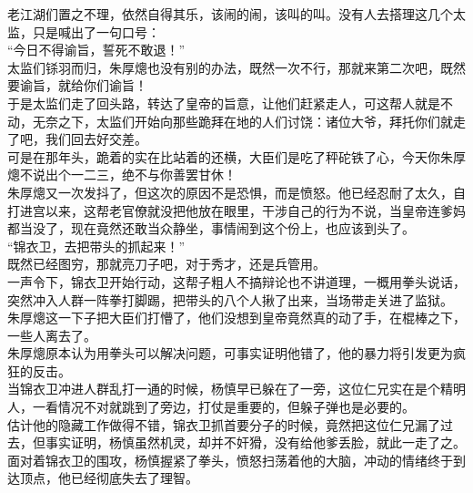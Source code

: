 \begin{multicols}{\theparacolNo}
老江湖们置之不理，依然自得其乐，该闹的闹，该叫的叫。没有人去搭理这几个太监，只是喊出了一句口号：\\

“今日不得谕旨，誓死不敢退！”\\

太监们铩羽而归，朱厚熜也没有别的办法，既然一次不行，那就来第二次吧，既然要谕旨，就给你们谕旨！\\

于是太监们走了回头路，转达了皇帝的旨意，让他们赶紧走人，可这帮人就是不动，无奈之下，太监们开始向那些跪拜在地的人们讨饶：诸位大爷，拜托你们就走了吧，我们回去好交差。\\

可是在那年头，跪着的实在比站着的还横，大臣们是吃了秤砣铁了心，今天你朱厚熜不说出个一二三，绝不与你善罢甘休！\\

朱厚熜又一次发抖了，但这次的原因不是恐惧，而是愤怒。他已经忍耐了太久，自打进宫以来，这帮老官僚就没把他放在眼里，干涉自己的行为不说，当皇帝连爹妈都当没了，现在竟然还敢当众静坐，事情闹到这个份上，也应该到头了。\\

“锦衣卫，去把带头的抓起来！”\\

既然已经图穷，那就亮刀子吧，对于秀才，还是兵管用。\\

一声令下，锦衣卫开始行动，这帮子粗人不搞辩论也不讲道理，一概用拳头说话，突然冲入人群一阵拳打脚踢，把带头的八个人揪了出来，当场带走关进了监狱。\\

朱厚熜这一下子把大臣们打懵了，他们没想到皇帝竟然真的动了手，在棍棒之下，一些人离去了。\\

朱厚熜原本认为用拳头可以解决问题，可事实证明他错了，他的暴力将引发更为疯狂的反击。\\

当锦衣卫冲进人群乱打一通的时候，杨慎早已躲在了一旁，这位仁兄实在是个精明人，一看情况不对就跳到了旁边，打仗是重要的，但躲子弹也是必要的。\\

估计他的隐藏工作做得不错，锦衣卫抓首要分子的时候，竟然把这位仁兄漏了过去，但事实证明，杨慎虽然机灵，却并不奸猾，没有给他爹丢脸，就此一走了之。\\

面对着锦衣卫的围攻，杨慎握紧了拳头，愤怒扫荡着他的大脑，冲动的情绪终于到达顶点，他已经彻底失去了理智。\\


\end{multicols}
